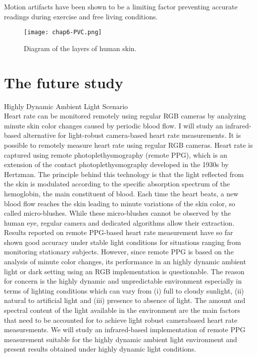 Motion artifacts have been shown to be a limiting factor preventing accurate readings
during exercise and free living conditions.
\begin{figure}[h]
  \centering
    \texttt{[image: chap6-PVC.png]}
  \caption{Diagram of the layers of human skin.}
  \label{fig:chap6-PVC}
\end{figure}

\section{The future study}

\begin{compactitem}
\item {Highly Dynamic Ambient Light Scenario}\cite {6799899}\\
Heart rate can be monitored remotely using regular RGB cameras by analyzing minute skin color changes caused
by periodic blood flow. I will study an infrared-based alternative for light-robust camera-based heart
rate measurements. It is possible to remotely measure heart rate using regular RGB cameras.
Heart rate is captured using remote photoplethysmography (remote PPG), which is an extension of the contact
photoplethysmography developed in the 1930s by Hertzman. The principle behind this
technology is that the light reflected from the skin is modulated according to the specific absorption
spectrum of the hemoglobin, the main constituent of blood. Each time the heart beats,
a new blood flow reaches the skin leading to minute variations of the skin color, so called micro-blushes.
While these micro-blushes cannot be observed by the human eye, regular camera and dedicated algorithms
allow their extraction. Results reported on remote PPG-based heart rate measurement have so far shown good
accuracy under stable light conditions for situations ranging from monitoring stationary subjects.
However, since remote PPG is based on the analysis of minute color changes, its performance in an
highly dynamic ambient light or dark setting using an RGB implementation is questionable.
The reason for concern is the highly dynamic and unpredictable environment especially in terms of lighting
conditions which can vary from (i) full to cloudy sunlight, (ii) natural to artificial light and (iii)
presence to absence of light. The amount and spectral content of the light available in the environment
are the main factors that need to be accounted for to achieve light robust camerabased heart rate measurements.
We will study an infrared-based implementation of remote PPG measurement suitable for the highly dynamic ambient light
environment and present results obtained under highly dynamic light
conditions.


\end{compactitem}
